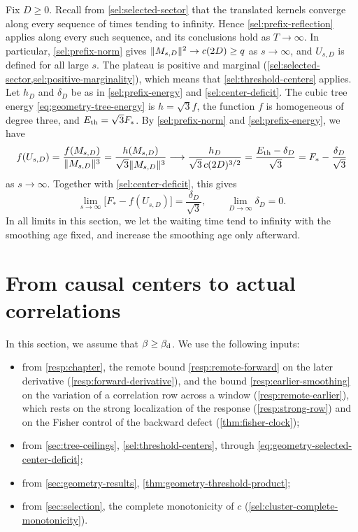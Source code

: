 Fix $D\ge0$. Recall from \cref{sel:selected-sector} that the translated kernels converge along every sequence of times tending to infinity. Hence \cref{sel:prefix-reflection} applies along every such sequence, and its conclusions hold as $T\to\infty$. In particular, \eqref{sel:prefix-norm} gives $\lVert M_{s,D}\rVert^2\to c(2D)\ge q$ as $s\to\infty$, and $U_{s,D}$ is defined for all large $s$. The plateau is positive and marginal (\cref{sel:selected-sector,sel:positive-marginality}), which means that \cref{sel:threshold-centers} applies. Let $h_D$ and $\delta_D$ be as in \eqref{sel:prefix-energy} and \eqref{sel:center-deficit}. The cubic tree energy \eqref{eq:geometry-tree-energy} is $h=\sqrt3f$, the function $f$ is homogeneous of degree three, and $E_{\mathrm{th}}=\sqrt3F_*$. By \eqref{sel:prefix-norm} and \eqref{sel:prefix-energy}, we have
\[
 f(U_{s,D})=\frac{f(M_{s,D})}{\lVert M_{s,D}\rVert^3}=\frac{h(M_{s,D})}{\sqrt3\lVert M_{s,D}\rVert^3}\longrightarrow\frac{h_D}{\sqrt3\,c(2D)^{3/2}}=\frac{E_{\mathrm{th}}-\delta_D}{\sqrt3}=F_*-\frac{\delta_D}{\sqrt3}
\]
as $s\to\infty$. Together with \eqref{sel:center-deficit}, this gives
\begin{equation}
 \lim_{s\to\infty}\bigl[F_*-f(U_{s,D})\bigr]=\frac{\delta_D}{\sqrt3},
 \qquad\lim_{D\to\infty}\delta_D=0 .
 \label{eq:geometry-selected-center-deficit}
\end{equation}
In all limits in this section, we let the waiting time tend to infinity with the smoothing age fixed, and increase the smoothing age only afterward.

\section{From causal centers to actual correlations}\label{sec:geometry-center-correlations}

In this section, we assume that $\beta\ge\beta_{\mathrm d}$. We use the following inputs:
\begin{itemize}
\item from \cref{resp:chapter}, the remote bound \eqref{resp:remote-forward} on the later derivative (\cref{resp:forward-derivative}), and the bound \eqref{resp:earlier-smoothing} on the variation of a correlation row across a window (\cref{resp:remote-earlier}), which rests on the strong localization of the response (\cref{resp:strong-row}) and on the Fisher control of the backward defect (\cref{thm:fisher-clock});
\item from \cref{sec:tree-ceilings}, \cref{sel:threshold-centers}, through \eqref{eq:geometry-selected-center-deficit};
\item from \cref{sec:geometry-results}, \cref{thm:geometry-threshold-product};
\item from \cref{sec:selection}, the complete monotonicity of $c$ (\cref{sel:cluster-complete-monotonicity}).
\end{itemize}

